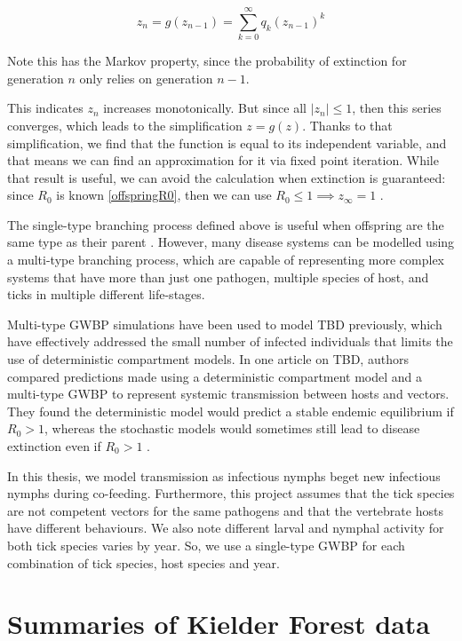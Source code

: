 \documentclass{article}
\begin{document}
\begin{equation}\label{BranchingProcessRecurrence}
    z_{n} = g(z_{n-1}) = \sum_{k=0}^\infty q_k (z_{n-1})^k
\end{equation}

Note this has the Markov property, since the probability of extinction for generation $ n $ only relies on generation $ n-1 $.

This indicates $ z_n $ increases monotonically. But since all $ |z_n| \le 1 $, then this series converges, which leads to the simplification $ z = g(z) $. Thanks to that simplification, we find that the function is equal to its independent variable, and that means we can find an approximation for it via fixed point iteration. While that result is useful, we can avoid the calculation when extinction is guaranteed: since $ R_0 $ is known \eqref{offspringR0}, then we can use $ R_0 \le 1 \implies z_{\infty} = 1 $ \cite{Diekman2000}.

The single-type branching process defined above is useful when offspring are the same type as their parent \cite{Allen2019}. However, many disease systems can be modelled using a multi-type branching process, which are capable of representing more complex systems that have more than just one pathogen, multiple species of host, and ticks in multiple different life-stages.

Multi-type GWBP simulations have been used to model TBD previously, which have effectively addressed the small number of infected individuals that limits the use of deterministic compartment models. In one article on TBD, authors compared predictions made using a deterministic compartment model and a multi-type GWBP to represent systemic transmission between hosts and vectors. They found the deterministic model would predict a stable endemic equilibrium if $ R_0 > 1 $, whereas the stochastic models would sometimes still lead to disease extinction even if $ R_0 > 1 $ \cite{Maliyoni_2017}. 

In this thesis, we model transmission as infectious nymphs beget new infectious nymphs during co-feeding. Furthermore, this project assumes that the tick species are not competent vectors for the same pathogens and that the vertebrate hosts have different behaviours. We also note different larval and nymphal activity for both tick species varies by year. So, we use a single-type GWBP for each combination of tick species, host species and year.

\newpage

\section{Summaries of Kielder Forest data}
\end{document}
